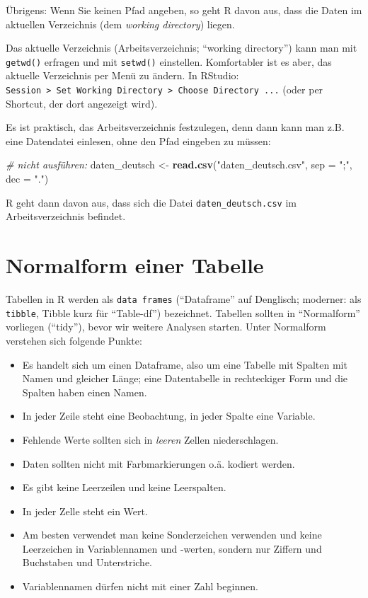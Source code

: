 \documentclass[12pt,ngerman,]{book}
\newenvironment{Shaded}{\begin{snugshade}}{\end{snugshade}}
\newcommand{\KeywordTok}[1]{\textcolor[rgb]{0.13,0.29,0.53}{\textbf{{#1}}}}
\newcommand{\DataTypeTok}[1]{\textcolor[rgb]{0.13,0.29,0.53}{{#1}}}
\newcommand{\StringTok}[1]{\textcolor[rgb]{0.31,0.60,0.02}{{#1}}}
\newcommand{\CommentTok}[1]{\textcolor[rgb]{0.56,0.35,0.01}{\textit{{#1}}}}
\newcommand{\NormalTok}[1]{{#1}}
\providecommand{\tightlist}{%
  \setlength{\itemsep}{0pt}\setlength{\parskip}{0pt}}
\renewenvironment{Shaded}{\begin{kframe}}{\end{kframe}}
\let\BeginKnitrBlock\begin \let\EndKnitrBlock\end
\begin{document}
\BeginKnitrBlock{rmdcaution}
Übrigens: Wenn Sie keinen Pfad angeben, so geht R davon aus, dass die
Daten im aktuellen Verzeichnis (dem \emph{working directory}) liegen.
\EndKnitrBlock{rmdcaution}

Das aktuelle Verzeichnis (Arbeitsverzeichnis; ``working directory'')
kann man mit \texttt{getwd()} erfragen und mit \texttt{setwd()}
einstellen. Komfortabler ist es aber, das aktuelle Verzeichnis per Menü
zu ändern. In RStudio:
\texttt{Session\ \textgreater{}\ Set\ Working\ Directory\ \textgreater{}\ Choose\ Directory\ ...}
(oder per Shortcut, der dort angezeigt wird).

Es ist praktisch, das Arbeitsverzeichnis festzulegen, denn dann kann man
z.B. eine Datendatei einlesen, ohne den Pfad eingeben zu müssen:

\begin{Shaded}
\begin{Highlighting}[]
\CommentTok{# nicht ausführen:}
\NormalTok{daten_deutsch <-}\StringTok{ }\KeywordTok{read.csv}\NormalTok{(}\StringTok{"daten_deutsch.csv"}\NormalTok{, }\DataTypeTok{sep =} \StringTok{";"}\NormalTok{, }\DataTypeTok{dec =} \StringTok{"."}\NormalTok{)}
\end{Highlighting}
\end{Shaded}

R geht dann davon aus, dass sich die Datei \texttt{daten\_deutsch.csv}
im Arbeitsverzeichnis befindet.

\section{Normalform einer Tabelle}\label{normalform-einer-tabelle}

Tabellen in R werden als \texttt{data\ frames} (``Dataframe'' auf
Denglisch; moderner: als \texttt{tibble}, Tibble kurz für ``Table-df'')
bezeichnet. Tabellen sollten in ``Normalform'' vorliegen (``tidy''),
bevor wir weitere Analysen starten. Unter Normalform verstehen sich
folgende Punkte:

\begin{itemize}
\tightlist
\item
  Es handelt sich um einen Dataframe, also um eine Tabelle mit Spalten
  mit Namen und gleicher Länge; eine Datentabelle in rechteckiger Form
  und die Spalten haben einen Namen.
\item
  In jeder Zeile steht eine Beobachtung, in jeder Spalte eine Variable.
\item
  Fehlende Werte sollten sich in \emph{leeren} Zellen niederschlagen.
\item
  Daten sollten nicht mit Farbmarkierungen o.ä. kodiert werden.
\item
  Es gibt keine Leerzeilen und keine Leerspalten.
\item
  In jeder Zelle steht ein Wert.
\item
  Am besten verwendet man keine Sonderzeichen verwenden und keine
  Leerzeichen in Variablennamen und -werten, sondern nur Ziffern und
  Buchstaben und Unterstriche.
\item
  Variablennamen dürfen nicht mit einer Zahl beginnen.
\end{itemize}
\end{document}
